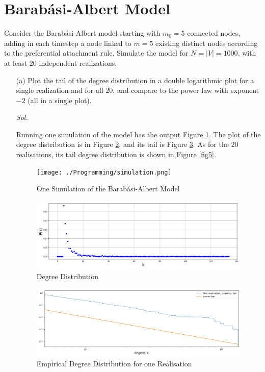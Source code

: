 \newpage
\section{Barab\'{a}si-Albert Model}

Consider the Barab\'{a}si-Albert model starting with $m_0 = 5$ connected nodes, adding in each timestep a node linked to $m=5$ existing distinct nodes according to the preferential attachment rule. Simulate the model for $N = |V| = 1000$, with at least $20$ independent realizations. 

\begin{enumerate}
    \item[(a)] Plot the tail of the degree distribution in a double logarithmic plot for a single realization and for all $20$, and compare to the power law with exponent $-2$ (all in a single plot).
    
    \textit{ Sol. }
    
    Running one simulation of the model has the output Figure \ref{fig2}. The plot of the degree distribution is in Figure \ref{fig3}, and its tail is Figure \ref{fig4}. As for the $20$ realisations, its tail degree distribution is shown in Figure \ref{fig5}.
    \begin{figure}[htbp]
        \texttt{[image: ./Programming/simulation.png]}
        \caption{One Simulation of the Barab\'{a}si-Albert Model}
        \label{fig2}
    \end{figure}
    
    \begin{figure}[htbp]
        \includegraphics[width=18cm]{./Programming/degree-distribution.png}
        \caption{Degree Distribution}
        \label{fig3}
    \end{figure}

    \begin{figure}[htbp]
        \includegraphics[width=18cm]{./Programming/1-realisation.png}
        \caption{Empirical Degree Distribution for one Realisation}
        \label{fig4}
    \end{figure}


\end{enumerate}
